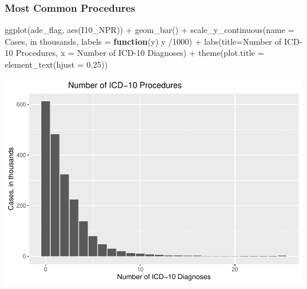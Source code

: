 \documentclass[preprint, 3p,
authoryear]{elsarticle} %
\newenvironment{Shaded}{\begin{snugshade}}{\end{snugshade}}
\newcommand{\AttributeTok}[1]{\textcolor[rgb]{0.77,0.63,0.00}{#1}}
\newcommand{\ControlFlowTok}[1]{\textcolor[rgb]{0.13,0.29,0.53}{\textbf{#1}}}
\newcommand{\DecValTok}[1]{\textcolor[rgb]{0.00,0.00,0.81}{#1}}
\newcommand{\FloatTok}[1]{\textcolor[rgb]{0.00,0.00,0.81}{#1}}
\newcommand{\FunctionTok}[1]{\textcolor[rgb]{0.00,0.00,0.00}{#1}}
\newcommand{\NormalTok}[1]{#1}
\newcommand{\SpecialCharTok}[1]{\textcolor[rgb]{0.00,0.00,0.00}{#1}}
\newcommand{\StringTok}[1]{\textcolor[rgb]{0.31,0.60,0.02}{#1}}
\begin{document}
\hypertarget{most-common-procedures}{%
\subsubsection{Most Common Procedures}\label{most-common-procedures}}

\begin{Shaded}
\begin{Highlighting}[]
\FunctionTok{ggplot}\NormalTok{(ade\_flag, }\FunctionTok{aes}\NormalTok{(I10\_NPR)) }\SpecialCharTok{+}
  \FunctionTok{geom\_bar}\NormalTok{() }\SpecialCharTok{+}
  \FunctionTok{scale\_y\_continuous}\NormalTok{(}\AttributeTok{name =} \StringTok{\textquotesingle{}Cases, in thousands\textquotesingle{}}\NormalTok{, }\AttributeTok{labels =} \ControlFlowTok{function}\NormalTok{(y) y }\SpecialCharTok{/}\DecValTok{1000}\NormalTok{) }\SpecialCharTok{+}
  \FunctionTok{labs}\NormalTok{(}\AttributeTok{title=}\StringTok{\textquotesingle{}Number of ICD{-}10 Procedures\textquotesingle{}}\NormalTok{, }\AttributeTok{x =} \StringTok{\textquotesingle{}Number of ICD{-}10 Diagnoses\textquotesingle{}}\NormalTok{) }\SpecialCharTok{+}
    \FunctionTok{theme}\NormalTok{(}\AttributeTok{plot.title =} \FunctionTok{element\_text}\NormalTok{(}\AttributeTok{hjust =} \FloatTok{0.25}\NormalTok{))}
\end{Highlighting}
\end{Shaded}

\includegraphics{final-project-paper_files/figure-latex/n-procedures-1.pdf}
\end{document}
